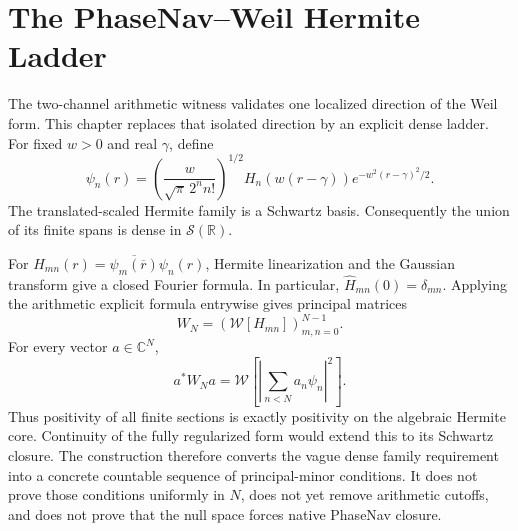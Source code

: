 \chapter{The PhaseNav--Weil Hermite Ladder}
\label{ch:hermite-ladder}

The two-channel arithmetic witness validates one localized direction of the
Weil form.  This chapter replaces that isolated direction by an explicit dense
ladder.  For fixed $w>0$ and real $\gamma$, define
\[
 \psi_n(r)=
 \left(\frac{w}{\sqrt\pi\,2^n n!}\right)^{1/2}
 H_n(w(r-\gamma))e^{-w^2(r-\gamma)^2/2}.
\]
The translated-scaled Hermite family is a Schwartz basis.  Consequently the
union of its finite spans is dense in $\mathcal S(\mathbb R)$.

For $H_{mn}(r)=\overline{\psi_m(\overline r)}\psi_n(r)$, Hermite
linearization and the Gaussian transform give a closed Fourier formula.  In
particular, $\widehat H_{mn}(0)=\delta_{mn}$.  Applying the arithmetic explicit
formula entrywise gives principal matrices
\[
 W_N=(\mathcal W[H_{mn}])_{m,n=0}^{N-1}.
\]
For every vector $a\in\mathbb C^N$,
\[
 a^*W_Na=\mathcal W\!\left[\left|\sum_{n<N}a_n\psi_n\right|^2\right].
\]
Thus positivity of all finite sections is exactly positivity on the algebraic
Hermite core.  Continuity of the fully regularized form would extend this to
its Schwartz closure.  The construction therefore converts the vague dense
family requirement into a concrete countable sequence of principal-minor
conditions.  It does not prove those conditions uniformly in $N$, does not yet
remove arithmetic cutoffs, and does not prove that the null space forces native
PhaseNav closure.
